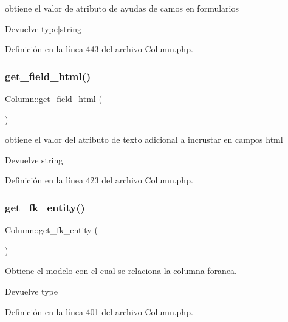 obtiene el valor de atributo de ayudas de camos en formularios

\begin{DoxyReturn}{Devuelve}
type$\vert$string 
\end{DoxyReturn}


Definición en la línea 443 del archivo Column.\+php.

\mbox{\label{class_column_aac0bf1664721d84626a1fc9eca321488}} 
\subsubsection{\texorpdfstring{get\_field\_html()}{get\_field\_html()}}
{\footnotesize\ttfamily Column\+::get\+\_\+field\+\_\+html (\begin{DoxyParamCaption}{ }\end{DoxyParamCaption})}

obtiene el valor del atributo de texto adicional a incrustar en campos html

\begin{DoxyReturn}{Devuelve}
string 
\end{DoxyReturn}


Definición en la línea 423 del archivo Column.\+php.

\mbox{\label{class_column_ac8077334a5b99bee2ff2d63f211373cc}} 
\subsubsection{\texorpdfstring{get\_fk\_entity()}{get\_fk\_entity()}}
{\footnotesize\ttfamily Column\+::get\+\_\+fk\+\_\+entity (\begin{DoxyParamCaption}{ }\end{DoxyParamCaption})}

Obtiene el modelo con el cual se relaciona la columna foranea.

\begin{DoxyReturn}{Devuelve}
type 
\end{DoxyReturn}


Definición en la línea 401 del archivo Column.\+php.

\mbox{\label{class_column_a43e6f982df392a8497bce9869142e66c}} 
